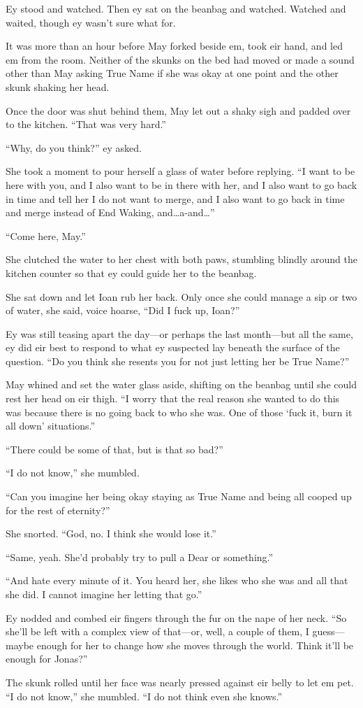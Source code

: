 Ey stood and watched. Then ey sat on the beanbag and watched. Watched and waited, though ey wasn't sure what for.

It was more than an hour before May forked beside em, took eir hand, and led em from the room. Neither of the skunks on the bed had moved or made a sound other than May asking True Name if she was okay at one point and the other skunk shaking her head.

Once the door was shut behind them, May let out a shaky sigh and padded over to the kitchen. ``That was very hard.''

``Why, do you think?'' ey asked.

She took a moment to pour herself a glass of water before replying. ``I want to be here with you, and I also want to be in there with her, and I also want to go back in time and tell her I do not want to merge, and I also want to go back in time and merge instead of End Waking, and\ldots a-and\ldots{}''

``Come here, May.''

She clutched the water to her chest with both paws, stumbling blindly around the kitchen counter so that ey could guide her to the beanbag.

She sat down and let Ioan rub her back. Only once she could manage a sip or two of water, she said, voice hoarse, ``Did I fuck up, Ioan?''

Ey was still teasing apart the day—or perhaps the last month—but all the same, ey did eir best to respond to what ey suspected lay beneath the surface of the question. ``Do you think she resents you for not just letting her be True Name?''

May whined and set the water glass aside, shifting on the beanbag until she could rest her head on eir thigh. ``I worry that the real reason she wanted to do this was because there is no going back to who she was. One of those `fuck it, burn it all down' situations.''

``There could be some of that, but is that so bad?''

``I do not know,'' she mumbled.

``Can you imagine her being okay staying as True Name and being all cooped up for the rest of eternity?''

She snorted. ``God, no. I think she would lose it.''

``Same, yeah. She'd probably try to pull a Dear or something.''

``And hate every minute of it. You heard her, she likes who she was and all that she did. I cannot imagine her letting that go.''

Ey nodded and combed eir fingers through the fur on the nape of her neck. ``So she'll be left with a complex view of that—or, well, a couple of them, I guess—maybe enough for her to change how she moves through the world. Think it'll be enough for Jonas?''

The skunk rolled until her face was nearly pressed against eir belly to let em pet. ``I do not know,'' she mumbled. ``I do not think even she knows.''
